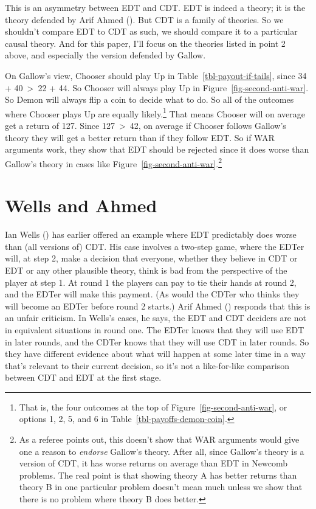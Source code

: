 \documentclass[
  10pt,
  letterpaper,
  DIV=11,
  numbers=noendperiod,
  twoside]{scrartcl}
\begin{document}
This is an asymmetry between EDT and CDT. EDT is indeed a theory; it is
the theory defended by Arif Ahmed (). But
CDT is a family of theories. So we shouldn't compare EDT to CDT as such,
we should compare it to a particular causal theory. And for this paper,
I'll focus on the theories listed in point 2 above, and especially the
version defended by Gallow.

On Gallow's view, Chooser should play Up in
Table~\ref{tbl-payout-if-tails}, since 34 + 40~\textgreater~22 + 44. So
Chooser will always play Up in Figure~\ref{fig-second-anti-war}. So
Demon will always flip a coin to decide what to do. So all of the
outcomes where Chooser plays Up are equally likely.\footnote{That is,
  the four outcomes at the top of Figure~\ref{fig-second-anti-war}, or
  options 1, 2, 5, and 6 in Table~\ref{tbl-payoffs-demon-coin}.} That
means Chooser will on average get a return of 127. Since
127~\textgreater~42, on average if Chooser follows Gallow's theory they
will get a better return than if they follow EDT. So if WAR arguments
work, they show that EDT should be rejected since it does worse than
Gallow's theory in cases like
Figure~\ref{fig-second-anti-war}.\footnote{As a referee points out, this
  doesn't show that WAR arguments would give one a reason to
  \emph{endorse} Gallow's theory. After all, since Gallow's theory is a
  version of CDT, it has worse returns on average than EDT in Newcomb
  problems. The real point is that showing theory A has better returns
  than theory B in one particular problem doesn't mean much unless we
  show that there is no problem where theory B does better.}

\section{Wells and Ahmed}\label{sec-wells-ahmed}

Ian Wells () has earlier offered an
example where EDT predictably does worse than (all versions of) CDT. His
case involves a two-step game, where the EDTer will, at step 2, make a
decision that everyone, whether they believe in CDT or EDT or any other
plausible theory, think is bad from the perspective of the player at
step 1. At round 1 the players can pay to tie their hands at round 2,
and the EDTer will make this payment. (As would the CDTer who thinks
they will become an EDTer before round 2 starts.) Arif Ahmed
() responds that this is an unfair
criticism. In Wells's cases, he says, the EDT and CDT deciders are not
in equivalent situations in round one. The EDTer knows that they will
use EDT in later rounds, and the CDTer knows that they will use CDT in
later rounds. So they have different evidence about what will happen at
some later time in a way that's relevant to their current decision, so
it's not a like-for-like comparison between CDT and EDT at the first
stage.
\end{document}
